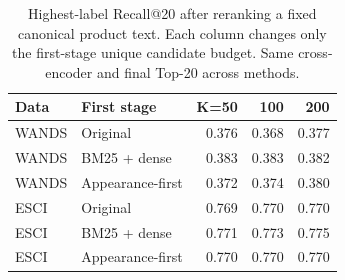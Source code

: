 \begin{table}[t]
\caption{Highest-label Recall@20 after reranking a fixed canonical product text. Each column changes only the first-stage unique candidate budget. Same cross-encoder and final Top-20 across methods.}
\label{tab:reranking}
\centering\small
\begin{tabular}{llrrr}\toprule
Data & First stage & K=50 & 100 & 200\\\midrule
WANDS & Original & 0.376 & 0.368 & 0.377\\
WANDS & BM25 + dense & 0.383 & 0.383 & 0.382\\
WANDS & Appearance-first & 0.372 & 0.374 & 0.380\\
ESCI & Original & 0.769 & 0.770 & 0.770\\
ESCI & BM25 + dense & 0.771 & 0.773 & 0.775\\
ESCI & Appearance-first & 0.770 & 0.770 & 0.770\\
\bottomrule\end{tabular}
\end{table}
